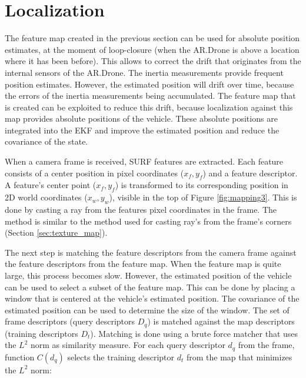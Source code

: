 	\section{Localization}
\label{sec:localization}

The feature map created in the previous section can be used for absolute position estimates, at the moment of loop-closure (when the AR.Drone is above a location where it has been before).
This allows to correct the drift that originates from the internal sensors of the AR.Drone.
The inertia measurements provide frequent position estimates.
However, the estimated position will drift over time, because the errors of the inertia measurements being accumulated.
The feature map that is created can be exploited to reduce this drift, because localization against this map provides absolute positions of the vehicle.
These absolute positions are integrated into the EKF and improve the estimated position and reduce the covariance of the state.

When a camera frame is received, SURF features are extracted.
Each feature consists of a center position in pixel coordinates ($x_f, y_f$) and a feature descriptor.
A feature's center point ($x_f, y_f$) is transformed to its corresponding position in 2D world coordinates ($x_w, y_w$), visible in the top of Figure \ref{fig:mapping3}.
This is done by casting a ray from the features pixel coordinates in the frame.
The method is similar to the method used for casting ray's from the frame's corners (Section \ref{sec:texture_map}).


The next step is matching the feature descriptors from the camera frame against the feature descriptors from the feature map.
When the feature map is quite large, this process becomes slow.
However, the estimated position of the vehicle can be used to select a subset of the feature map.
This can be done by placing a window that is centered at the vehicle's estimated position.
The covariance of the estimated position can be used to determine the size of the window.
The set of frame descriptors (query descriptors $D_q$) is matched against the map descriptors (training descriptors $D_t$).
Matching is done using a brute force matcher that uses the $L^2$ norm as similarity measure.
For each query descriptor $d_q$ from the frame, function $C(d_q)$ selects the training descriptor $d_t$ from the map that minimizes the $L^2$ norm:


